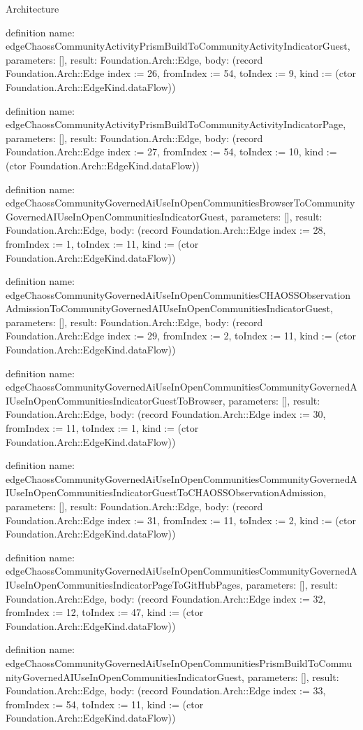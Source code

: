 \begin{lexlean}{Architecture}
\begin{semanticmodule}
definition{
  name: edgeChaossCommunityActivityPrismBuildToCommunityActivityIndicatorGuest,
  parameters: [],
  result: Foundation.Arch::Edge,
  body: (record Foundation.Arch::Edge {index := 26, fromIndex := 54, toIndex := 9, kind := (ctor Foundation.Arch::EdgeKind.dataFlow)})
}

definition{
  name: edgeChaossCommunityActivityPrismBuildToCommunityActivityIndicatorPage,
  parameters: [],
  result: Foundation.Arch::Edge,
  body: (record Foundation.Arch::Edge {index := 27, fromIndex := 54, toIndex := 10, kind := (ctor Foundation.Arch::EdgeKind.dataFlow)})
}

definition{
  name: edgeChaossCommunityGovernedAiUseInOpenCommunitiesBrowserToCommunityGovernedAIUseInOpenCommunitiesIndicatorGuest,
  parameters: [],
  result: Foundation.Arch::Edge,
  body: (record Foundation.Arch::Edge {index := 28, fromIndex := 1, toIndex := 11, kind := (ctor Foundation.Arch::EdgeKind.dataFlow)})
}

definition{
  name: edgeChaossCommunityGovernedAiUseInOpenCommunitiesCHAOSSObservationAdmissionToCommunityGovernedAIUseInOpenCommunitiesIndicatorGuest,
  parameters: [],
  result: Foundation.Arch::Edge,
  body: (record Foundation.Arch::Edge {index := 29, fromIndex := 2, toIndex := 11, kind := (ctor Foundation.Arch::EdgeKind.dataFlow)})
}

definition{
  name: edgeChaossCommunityGovernedAiUseInOpenCommunitiesCommunityGovernedAIUseInOpenCommunitiesIndicatorGuestToBrowser,
  parameters: [],
  result: Foundation.Arch::Edge,
  body: (record Foundation.Arch::Edge {index := 30, fromIndex := 11, toIndex := 1, kind := (ctor Foundation.Arch::EdgeKind.dataFlow)})
}

definition{
  name: edgeChaossCommunityGovernedAiUseInOpenCommunitiesCommunityGovernedAIUseInOpenCommunitiesIndicatorGuestToCHAOSSObservationAdmission,
  parameters: [],
  result: Foundation.Arch::Edge,
  body: (record Foundation.Arch::Edge {index := 31, fromIndex := 11, toIndex := 2, kind := (ctor Foundation.Arch::EdgeKind.dataFlow)})
}

definition{
  name: edgeChaossCommunityGovernedAiUseInOpenCommunitiesCommunityGovernedAIUseInOpenCommunitiesIndicatorPageToGitHubPages,
  parameters: [],
  result: Foundation.Arch::Edge,
  body: (record Foundation.Arch::Edge {index := 32, fromIndex := 12, toIndex := 47, kind := (ctor Foundation.Arch::EdgeKind.dataFlow)})
}

definition{
  name: edgeChaossCommunityGovernedAiUseInOpenCommunitiesPrismBuildToCommunityGovernedAIUseInOpenCommunitiesIndicatorGuest,
  parameters: [],
  result: Foundation.Arch::Edge,
  body: (record Foundation.Arch::Edge {index := 33, fromIndex := 54, toIndex := 11, kind := (ctor Foundation.Arch::EdgeKind.dataFlow)})
}


\end{semanticmodule}
\end{lexlean}
